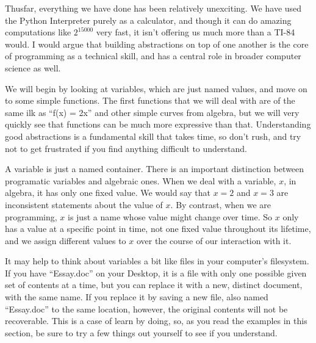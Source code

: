 

Thusfar, everything we have done has been relatively unexciting.
We have used the Python Interpreter purely as a calculator, and though it can do amazing computations like $2^{15000}$ very fast, it isn't offering us much more than a TI-84 would.
I would argue that building abstractions on top of one another is the core of programming as a technical skill, and has a central role in broader computer science as well.

We will begin by looking at variables, which are just named values, and move on to some simple functions.
The first functions that we will deal with are of the same ilk as ``f(x) = 2x'' and other simple curves from algebra, but we will very quickly see that functions can be much more expressive than that.
Understanding good abstractions is a fundamental skill that takes time, so don't rush, and try not to get frustrated if you find anything difficult to understand.


A variable is just a named container.
There is an important distinction between programatic variables and algebraic ones.
When we deal with a variable, $x$, in algebra, it has only one fixed value.
We would say that $x=2$ and $x=3$ are inconsistent statements about the value of $x$.
By contrast, when we are programming, $x$ is just a name whose value might change over time.
So $x$ only has a value at a specific point in time, not one fixed value throughout its lifetime, and we assign different values to $x$ over the course of our interaction with it.

It may help to think about variables a bit like files in your computer's filesystem.
If you have ``Essay.doc'' on your Desktop, it is a file with only one possible given set of contents at a time, but you can replace it with a new, distinct document, with the same name.
If you replace it by saving a new file, also named ``Essay.doc'' to the same location, however, the original contents will not be recoverable.
This is a case of learn by doing, so, as you read the examples in this section, be sure to try a few things out yourself to see if you understand.

